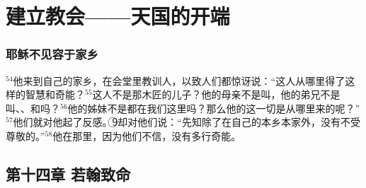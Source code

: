 \section{建立教会——天国的开端}


\subsubsection{耶稣不见容于家乡}
$^{54}$他来到自己的家乡，在会堂里教训人，以致人们都惊讶说：“这人从哪里得了这样的智慧和奇能？$^{55}$这人不是那木匠的儿子？他的母亲不是叫\UL[玛利亚]，他的弟兄不是叫\UL[雅各伯]、\UL[若瑟]、\UL[西满]和\UL[犹达]吗？$^{56}$他的姊妹不是都在我们这里吗？那么他的这一切是从哪里来的呢？”$^{57}$他们就对他起了反感。\textcircled{9}\UL[耶稣]却对他们说：“先知除了在自己的本乡本家外，没有不受尊敬的。”$^{58}$他在那里，因为他们不信，没有多行奇能。


\subsection{第十四章 若翰致命}